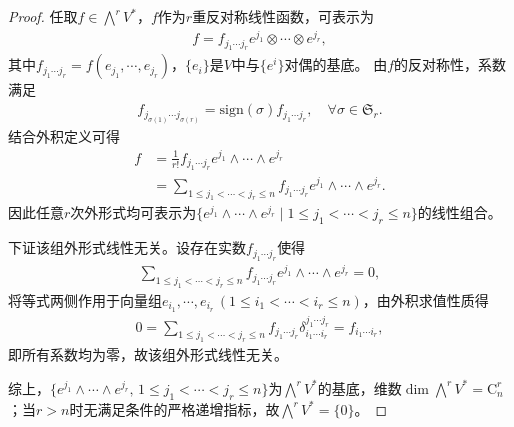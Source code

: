 \documentclass[../../main.tex]{subfiles}%
\begin{document}
\begin{proof}

任取$f\in\bigwedge^r V^*$，$f$作为$r$重反对称线性函数，可表示为
\begin{align*}
f = f_{j_1\cdots j_r}e^{j_1}\otimes\cdots\otimes e^{j_r},
\end{align*}
其中$f_{j_1\cdots j_r}=f(e_{j_1},\cdots,e_{j_r})$，$\{e_i\}$是$V$中与$\{e^i\}$对偶的基底。
由$f$的反对称性，系数满足
\begin{align*}
f_{j_{\sigma(1)}\cdots j_{\sigma(r)}} = \mathrm{sign}(\sigma)f_{j_1\cdots j_r},\quad \forall\sigma\in\mathfrak{S}_r.
\end{align*}
结合外积定义可得
\begin{align}
f &= \frac{1}{r!}f_{j_1\cdots j_r}e^{j_1}\land\cdots\land e^{j_r} \nonumber \\
&= \sum\limits_{1\leqslant j_1<\cdots<j_r\leqslant n} f_{j_1\cdots j_r}e^{j_1}\land\cdots\land e^{j_r}. \label{eq:r-form-basis-expand}
\end{align}
因此任意$r$次外形式均可表示为$\{e^{j_1}\land\cdots\land e^{j_r}\mid 1\leqslant j_1<\cdots<j_r\leqslant n\}$的线性组合。

下证该组外形式线性无关。设存在实数$f_{j_1\cdots j_r}$使得
\begin{align*}
\sum\limits_{1\leqslant j_1<\cdots<j_r\leqslant n} f_{j_1\cdots j_r}e^{j_1}\land\cdots\land e^{j_r}=0,
\end{align*}
将等式两侧作用于向量组$e_{i_1},\cdots,e_{i_r}\,(1\leqslant i_1<\cdots<i_r\leqslant n)$，由外积求值性质得
\begin{align*}
0 = \sum\limits_{1\leqslant j_1<\cdots<j_r\leqslant n} f_{j_1\cdots j_r}\delta_{i_1\cdots i_r}^{j_1\cdots j_r}=f_{i_1\cdots i_r},
\end{align*}
即所有系数均为零，故该组外形式线性无关。

综上，$\{e^{j_1}\land\cdots\land e^{j_r},\,1\leqslant j_1<\cdots<j_r\leqslant n\}$为$\bigwedge^r V^*$的基底，维数$\dim\bigwedge^r V^*=\mathrm{C}_n^r$；当$r>n$时无满足条件的严格递增指标，故$\bigwedge^r V^*=\{0\}$。

\end{proof}
\end{document}
